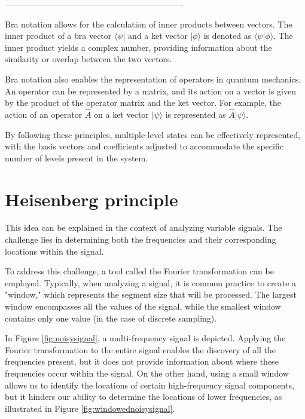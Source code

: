 			\par ----------------------------------------------------------------
		
			\par Bra notation allows for the calculation of inner products between vectors. The inner product of a bra vector $\langle \psi |$ and a ket vector $| \phi \rangle$ is denoted as $\langle \psi | \phi \rangle$. The inner product yields a complex number, providing information about the similarity or overlap between the two vectors.\newline

			\par Bra notation also enables the representation of operators in quantum mechanics. An operator can be represented by a matrix, and its action on a vector is given by the product of the operator matrix and the ket vector. For example, the action of an operator $\hat{A}$ on a ket vector $| \psi \rangle$ is represented as $\hat{A} | \psi \rangle$.\newline

			\par By following these principles, multiple-level states can be effectively represented, with the basis vectors and coefficients adjusted to accommodate the specific number of levels present in the system.\newline


	\section{Heisenberg principle}
	
		\par This idea can be explained in the context of analyzing variable signals. The challenge lies in determining both the frequencies and their corresponding locations within the signal.\newline
		
		\par To address this challenge, a tool called the Fourier transformation can be employed. Typically, when analyzing a signal, it is common practice to create a "window," which represents the segment size that will be processed. The largest window encompasses all the values of the signal, while the smallest window contains only one value (in the case of discrete sampling).\newline
		
		\par In Figure \ref{fig:noisysignal}, a multi-frequency signal is depicted. Applying the Fourier transformation to the entire signal enables the discovery of all the frequencies present, but it does not provide information about where these frequencies occur within the signal. On the other hand, using a small window allows us to identify the locations of certain high-frequency signal components, but it hinders our ability to determine the locations of lower frequencies, as illustrated in Figure \ref{fig:windowednoisysignal}.\newline
		

